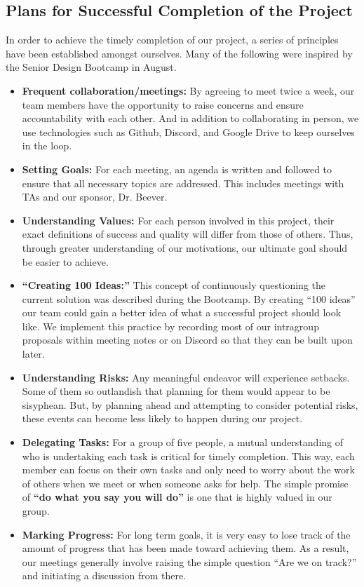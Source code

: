 \subsection{Plans for Successful Completion of the Project}
In order to achieve the timely completion of our project, a series of principles have been established amongst ourselves. Many of the following were inspired by the Senior Design Bootcamp in August.
\begin{itemize}
  \item \textbf{Frequent collaboration/meetings:} By agreeing to meet twice a week, our team members have the opportunity to raise concerns and ensure accountability with each other. And in addition to collaborating in person, we use technologies such as Github, Discord, and Google Drive to keep ourselves in the loop.
  \item \textbf{Setting Goals:} For each meeting, an agenda is written and followed to ensure that all necessary topics are addressed. This includes meetings with TAs and our sponsor, Dr. Beever.
  \item \textbf{Understanding Values:} For each person involved in this project, their exact definitions of success and quality will differ from those of others. Thus, through greater understanding of  our motivations, our ultimate goal should be easier to achieve.
  \item \textbf{``Creating 100 Ideas:''} This concept of continuously questioning the current solution was described during the Bootcamp. By creating ``100 ideas'' our team could gain a better idea of what a successful project should look like. We implement this practice by recording most of our intragroup proposals within meeting notes or on Discord so that they can be built upon later.
  \item \textbf{Understanding Risks:} Any meaningful endeavor will experience setbacks. Some of them so outlandish that planning for them would appear to be sisyphean. But, by planning ahead and attempting to consider potential risks, these events can become less likely to happen during our project.
  \item \textbf{Delegating Tasks:} For a group of five people, a mutual understanding of who is undertaking each task is critical for timely completion. This way, each member can focus on their own tasks and only need to worry about the work of others when we meet or when someone asks for help. The simple promise of \textbf{``do what you say you will do''} is one that is highly valued in our group.
  \item \textbf{Marking Progress:} For long term goals, it is very easy to lose track of the amount of progress that has been made toward achieving them. As a result, our meetings generally involve raising the simple question ``Are we on track?'' and initiating a discussion from there.

\end{itemize}
